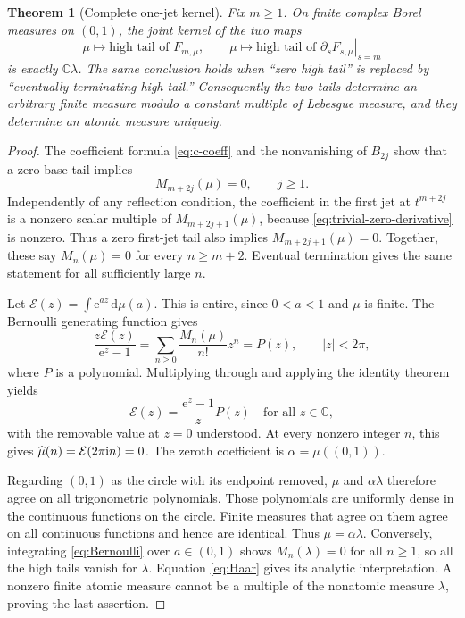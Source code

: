 \documentclass[11pt,a4paper]{article}
\numberwithin{equation}{section}
\newtheorem{theorem}{Theorem}[section]
\theoremstyle{definition}\newtheorem{definition}[theorem]{Definition}
\theoremstyle{remark}\newtheorem{remark}[theorem]{Remark}
\newcommand{\C}{\mathbb C}\newcommand{\R}{\mathbb R}
\newcommand{\ii}{\mathrm i}\newcommand{\e}{\mathrm e}
\newcommand{\dd}{\,\mathrm d}\newcommand{\Li}{\operatorname{Li}}
\begin{document}
\begin{theorem}[Complete one-jet kernel]\label{thm:one-jet}
Fix $m\ge1$. On finite complex Borel measures on $(0,1)$, the joint
kernel of the two maps
\begin{equation}
 \mu\longmapsto\text{high tail of }F_{m,\mu},\qquad
 \mu\longmapsto\text{high tail of }
                          \left.\partial_sF_{s,\mu}\right|_{s=m}
 \label{eq:jet-map}
\end{equation}
is exactly $\C\lambda$. The same conclusion holds when ``zero high
tail'' is replaced by ``eventually terminating high tail.''
Consequently the two tails determine an arbitrary finite measure
modulo a constant multiple of Lebesgue measure, and they determine an
atomic measure uniquely.
\end{theorem}
\begin{proof}
The coefficient formula \eqref{eq:c-coeff} and the nonvanishing of
$B_{2j}$ show that a zero base tail implies
\[
 M_{m+2j}(\mu)=0,\qquad j\ge1.
\]
Independently of any reflection condition, the coefficient in the first
jet at $t^{m+2j}$ is a nonzero scalar multiple of
$M_{m+2j+1}(\mu)$, because \eqref{eq:trivial-zero-derivative} is nonzero.
Thus a zero first-jet tail also implies
$M_{m+2j+1}(\mu)=0$. Together, these say $M_n(\mu)=0$ for every
$n\ge m+2$. Eventual termination gives the same statement for all
sufficiently large $n$.

Let $\mathcal E(z)=\int\e^{az}\dd\mu(a)$. This is entire, since
$0<a<1$ and $\mu$ is finite. The Bernoulli generating function gives
\[
 \frac{z\mathcal E(z)}{\e^z-1}
       =\sum_{n\ge0}\frac{M_n(\mu)}{n!}z^n
       =P(z),\qquad |z|<2\pi,
\]
where $P$ is a polynomial. Multiplying through and applying the
identity theorem yields
\begin{equation}
 \mathcal E(z)=\frac{\e^z-1}{z}P(z)\quad\text{for all }z\in\C,
 \label{eq:measure-entire}
\end{equation}
with the removable value at $z=0$ understood. At every nonzero integer
$n$, this gives $\muh(n)=\mathcal E(2\pi\ii n)=0$.
The zeroth coefficient is $\alpha=\mu((0,1))$.

Regarding $(0,1)$ as the circle with its endpoint removed, $\mu$ and
$\alpha\lambda$ therefore agree on all trigonometric polynomials.
Those polynomials are uniformly dense in the continuous functions on
the circle. Finite measures that agree on them agree on all continuous
functions and hence are identical. Thus $\mu=\alpha\lambda$.
Conversely, integrating \eqref{eq:Bernoulli} over $a\in(0,1)$ shows
$M_n(\lambda)=0$ for all $n\ge1$, so all the high tails vanish for
$\lambda$. Equation \eqref{eq:Haar} gives its analytic interpretation.
A nonzero finite atomic measure cannot be a multiple of the nonatomic
measure $\lambda$, proving the last assertion.
\end{proof}
\end{document}
